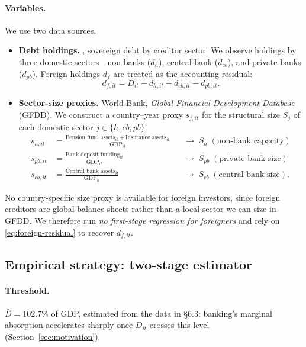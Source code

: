 \documentclass[\latexroot/\projectname]{subfiles}
\begin{document}
\paragraph{Variables.}
We use two data sources.
\begin{itemize}
  \item \textbf{Debt holdings.} \citet{ArslanalpTsuda2014}, sovereign
        debt by creditor sector. We observe holdings by three domestic
        sectors---non-banks ($d_h$), central bank ($d_{cb}$), and
        private banks ($d_{pb}$). Foreign holdings $d_f$ are treated
        as the accounting residual:
        \begin{equation}\label{eq:foreign-residual}
          d_{f,it}=D_{it}-d_{h,it}-d_{cb,it}-d_{pb,it}.
        \end{equation}
  \item \textbf{Sector-size proxies.} World Bank,
        \emph{Global Financial Development Database} (GFDD). We
        construct a country--year proxy $s_{j,it}$ for the structural
        size $S_j$ of each domestic sector $j\in\{h,cb,pb\}$:
        \begin{align*}
          s_{h,it}  &= \tfrac{\text{Pension fund assets}_{it}+\text{Insurance assets}_{it}}{\text{GDP}_{it}}
                       && \to\; S_h\;(\text{non-bank capacity}) \\
          s_{pb,it} &= \tfrac{\text{Bank deposit funding}_{it}}{\text{GDP}_{it}}
                       && \to\; S_{pb}\;(\text{private-bank size}) \\
          s_{cb,it} &= \tfrac{\text{Central bank assets}_{it}}{\text{GDP}_{it}}
                       && \to\; S_{cb}\;(\text{central-bank size}).
        \end{align*}
\end{itemize}
No country-specific size proxy is available for foreign investors,
since foreign creditors are global balance sheets rather than a local
sector we can size in GFDD. We therefore run \emph{no first-stage
regression for foreigners} and rely on \eqref{eq:foreign-residual} to
recover $d_{f,it}$.

\subsection{Empirical strategy: two-stage estimator}

\paragraph{Threshold.}
$\bar D = 102.7\%$ of GDP, estimated from the data in \S6.3:
banking's marginal absorption accelerates sharply once $D_{it}$
crosses this level (Section~\ref{sec:motivation}).
\end{document}
